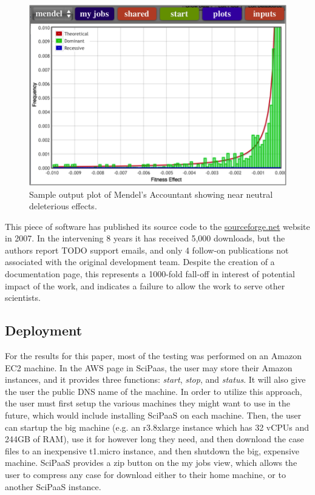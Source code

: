 \documentclass[10pt,reprint]{socc14}
\begin{document}
\begin{figure}[t]
\centering
\includegraphics[natwidth=454,natheight=319]{figs/neutral.png}
\caption{Sample output plot of Mendel’s Accountant showing near neutral deleterious effects.\label{neutral}}
\end{figure}

This piece of software has published its source code to the \url{sourceforge.net} website in 2007. In the intervening 8 years it has received 5,000 downloads, but
the authors report TODO support emails, and only 4 follow-on publications not associated with the original development team.
Despite the creation of a documentation page, this represents a 1000-fold fall-off in interest of potential impact of the work, and indicates a failure to allow the work to serve other scientists.

\subsection{Deployment}

For the results for this paper, most of the testing was performed on an Amazon EC2 machine. In the AWS page in SciPaas, the user may store their Amazon instances, and it provides three functions: \textit{start}, \textit{stop}, and \textit{status}. It will also give the user the public DNS name of the machine.  In order to utilize this approach, the user must first setup the various machines they might want to use in the future, which would include installing SciPaaS on each machine.  Then, the user can startup the big machine (e.g. an r3.8xlarge instance which has 32 vCPUs and 244GB of RAM), use it for however long they need, and then download the case files to an inexpensive t1.micro instance, and then shutdown the big, expensive machine. SciPaaS provides a zip button on the my jobs view, which allows the user to compress any case for download either to their home machine, or to another SciPaaS instance.
\end{document}
